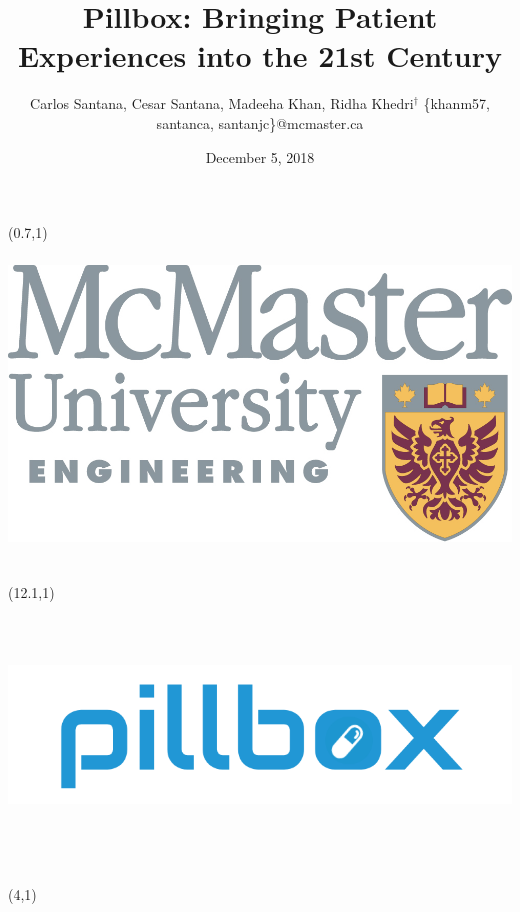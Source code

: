 \documentclass[22pt]{beamer}
\title{Pillbox: Bringing Patient Experiences into the 21st Century}
\author[Santana, Santana, Khan \& Khedri]{Carlos Santana, Cesar Santana, Madeeha Khan, Ridha Khedri$^\dagger$ \vspace{0.3cm} \newline \small \{khanm57, santanca, santanjc\}@mcmaster.ca}
\institute[McMaster University]{$^\dagger$Department of Computing and Software, McMaster University}
\date{December 5, 2018}
\begin{document}

\begin{frame}[fragile]

\begin{textblock}{2}(0.7,1)
\includegraphics[height=8.5cm]{englogo.png} %
\end{textblock}

\begin{textblock}{2}(12.1,1)
\includegraphics[height=7cm, width=20cm]{pillbox_logo.png}
\end{textblock}

\begin{textblock}{8}(4,1)
\titlepage
\end{textblock}


\end{frame}
\end{document}

